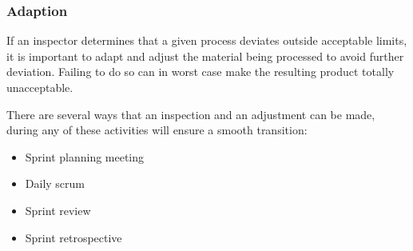 \subsubsection{Adaption}


If an inspector determines that a given process deviates outside acceptable limits, it is
important to adapt and adjust the material being processed to avoid further
deviation\cite{scrumguide11}. Failing to do so can in worst case make the resulting product
totally unacceptable\cite{scrumguide11}.

There are several ways that an inspection and an adjustment can be made, during any of these
activities will ensure a smooth transition:

\begin{itemize}
	\item Sprint planning meeting
	\item	Daily scrum
	\item	Sprint review
	\item	Sprint retrospective
\end{itemize}